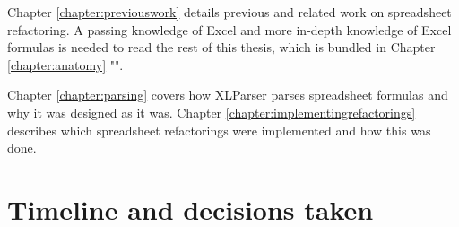 Chapter \ref{chapter:previouswork} details previous and related work on spreadsheet refactoring.
A passing knowledge of Excel and more in-depth knowledge of Excel formulas is needed to read the rest of this thesis, which is bundled in Chapter \ref{chapter:anatomy} "".

Chapter \ref{chapter:parsing} covers how XLParser parses spreadsheet formulas and why it was designed as it was.
Chapter \ref{chapter:implementingrefactorings} describes which spreadsheet refactorings were implemented and how this was done.

\clearpage
\section{Timeline and decisions taken}

